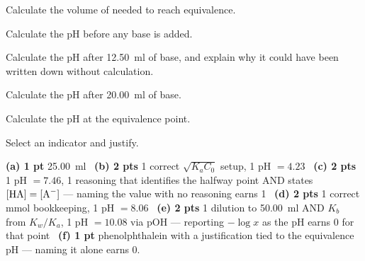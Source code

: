 \documentclass{apchem-worksheet}
\begin{document}
\begin{parts}
  \item Calculate the volume of  needed to reach equivalence.
  \item Calculate the pH before any base is added. \workspace[2.4cm]
  \item Calculate the pH after \SI{12.50}{\milli\litre} of base, and
        explain why it could have been written down without calculation.
  \item Calculate the pH after \SI{20.00}{\milli\litre} of base.
        \workspace[2.4cm]
  \item Calculate the pH at the equivalence point. \workspace[3cm]
  \item Select an indicator and justify.
\end{parts}

\begin{apcnote}
\textbf{(a) 1 pt} \SI{25.00}{\milli\litre} \textbullet\ \textbf{(b) 2 pts}
1 correct $\sqrt{K_aC_0}$ setup, 1 pH $= 4.23$ \textbullet\
\textbf{(c) 2 pts} 1 pH $= 7.46$, 1 reasoning that identifies the halfway
point AND states $[\ce{HA}] = [\ce{A^-}]$ --- naming the value with no
reasoning earns 1 \textbullet\ \textbf{(d) 2 pts} 1 correct mmol
bookkeeping, 1 pH $= 8.06$ \textbullet\ \textbf{(e) 2 pts} 1 dilution to
\SI{50.00}{\milli\litre} AND $K_b$ from $K_w/K_a$, 1 pH $= 10.08$ via pOH
--- reporting $-\log x$ as the pH earns 0 for that point \textbullet\
\textbf{(f) 1 pt} phenolphthalein with a justification tied to the
equivalence pH --- naming it alone earns 0.
\end{apcnote}
\end{document}
